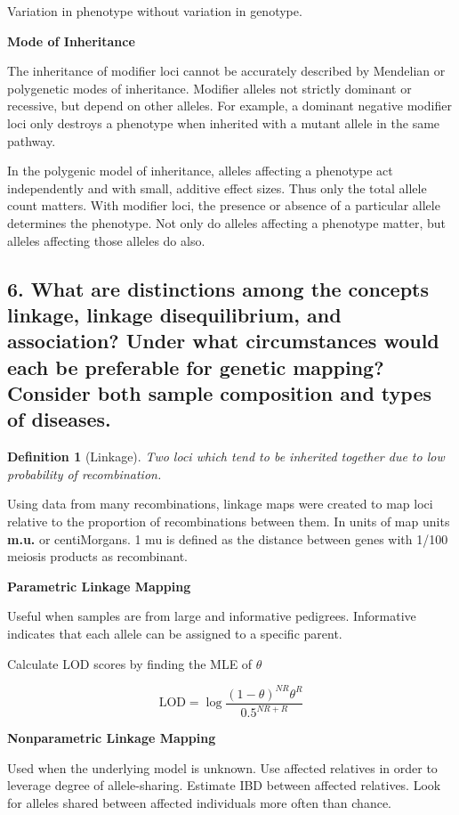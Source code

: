 \documentclass{tufte-handout}
\theoremstyle{noparens}
\newtheorem*{define}{Definition}
\begin{document}
Variation in phenotype without variation in genotype. 

\noindent
\textbf{Mode of Inheritance}

The inheritance of modifier loci cannot be accurately described by Mendelian or polygenetic modes of inheritance. Modifier alleles not strictly dominant or recessive, but depend on other alleles. For example, a dominant negative modifier loci only destroys a phenotype when inherited with a mutant allele in the same pathway.

In the polygenic model of inheritance, alleles affecting a phenotype act independently and with small, additive effect sizes. Thus only the total allele count matters. With modifier loci, the presence or absence of a particular allele determines the phenotype. Not only do alleles affecting a phenotype matter, but alleles affecting those alleles do also.

\newpage
\subsection{6. What are distinctions among the concepts linkage, linkage disequilibrium, and association? Under what circumstances would each be preferable for genetic mapping? Consider both sample composition and types of diseases.}
\label{subsec:06}

\begin{define}[Linkage]
Two loci which tend to be inherited together due to low probability of recombination.
\end{define}

Using data from many recombinations, linkage maps were created to map loci relative to the proportion of recombinations between them. In units of map units \textbf{m.u.} or centiMorgans. 1 mu is defined as the distance between genes with 1/100 meiosis products as recombinant. 

\noindent
\textbf{Parametric Linkage Mapping}

Useful when samples are from large and informative pedigrees. Informative indicates that each allele can be assigned to 	a specific parent.

Calculate LOD scores by finding the MLE of $\theta$

\[ \text{LOD} = \log \frac{(1-\theta)^{NR}\theta^R}{0.5^{NR+R}} \]

\noindent
\textbf{Nonparametric Linkage Mapping}

Used when the underlying model is unknown. Use affected relatives in order to leverage degree of allele-sharing. Estimate IBD between affected relatives. Look for alleles shared between affected individuals more often than chance.
\end{document}
